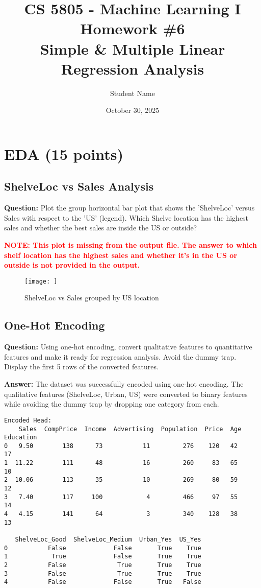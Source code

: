 \documentclass[11pt]{article}
\title{CS 5805 - Machine Learning I\\Homework \#6\\Simple \& Multiple Linear Regression Analysis}
\author{Student Name}
\date{October 30, 2025}
\begin{document}
\maketitle

\section{EDA (15 points)}

\subsection{ShelveLoc vs Sales Analysis}

\textbf{Question:} Plot the group horizontal bar plot that shows the 'ShelveLoc' versus Sales with respect to the 'US' (legend). Which Shelve location has the highest sales and whether the best sales are inside the US or outside?

\textcolor{red}{\textbf{NOTE: This plot is missing from the output file. The answer to which shelf location has the highest sales and whether it's in the US or outside is not provided in the output.}}

\begin{figure}[H]
    \centering
    \texttt{[image: ]}
    \caption{ShelveLoc vs Sales grouped by US location}
    \label{fig:shelveloc_sales}
\end{figure}

\subsection{One-Hot Encoding}

\textbf{Question:} Using one-hot encoding, convert qualitative features to quantitative features and make it ready for regression analysis. Avoid the dummy trap. Display the first 5 rows of the converted features.

\textbf{Answer:} The dataset was successfully encoded using one-hot encoding. The qualitative features (ShelveLoc, Urban, US) were converted to binary features while avoiding the dummy trap by dropping one category from each.

\begin{verbatim}
Encoded Head:
    Sales  CompPrice  Income  Advertising  Population  Price  Age  Education
0   9.50        138      73           11         276    120   42         17
1  11.22        111      48           16         260     83   65         10
2  10.06        113      35           10         269     80   59         12
3   7.40        117     100            4         466     97   55         14
4   4.15        141      64            3         340    128   38         13

   ShelveLoc_Good  ShelveLoc_Medium  Urban_Yes  US_Yes
0           False             False       True    True
1            True             False       True    True
2           False              True       True    True
3           False              True       True    True
4           False             False       True   False
\end{verbatim}
\end{document}
